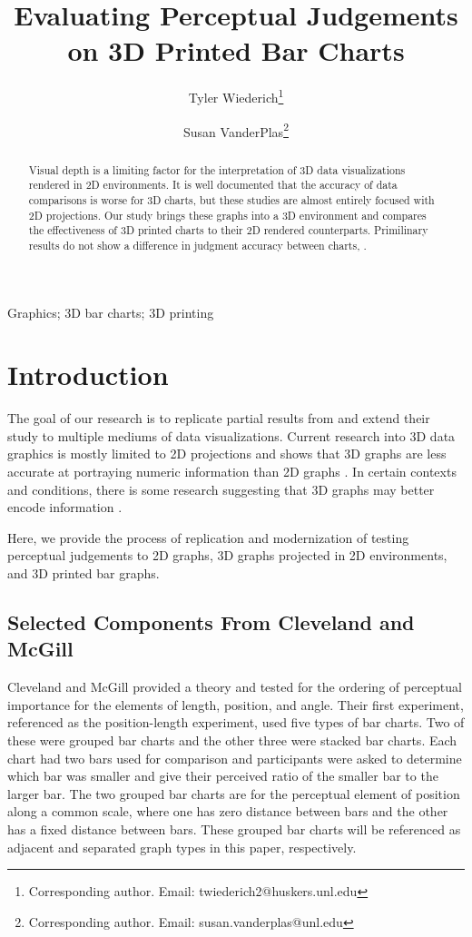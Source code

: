 \documentclass[letterpaper, inpress]{jds} %
\title[Perceptual Judgements on 3D Bar Charts]{Evaluating Perceptual Judgements on 3D Printed Bar Charts}
\author[1]{Tyler Wiederich\thanks{Corresponding author. Email: twiederich2@huskers.unl.edu}}
\author[1]{Susan VanderPlas\footnote{Corresponding author. Email: susan.vanderplas@unl.edu}}
\affil[1]{Department of Statistics, University of Nebraska-Lincoln}
\begin{document}
\maketitle

\begin{abstract}
  Visual depth is a limiting factor for the interpretation of 3D data visualizations rendered in 2D environments. 
  It is well documented that the accuracy of data comparisons is worse for 3D charts, but these studies are almost entirely focused with 2D projections.
  Our study brings these graphs into a 3D environment and compares the effectiveness of 3D printed charts to their 2D rendered counterparts.
  Primilinary results do not show a difference in judgment accuracy between charts, .\@
\end{abstract}

\begin{keywords} %
  Graphics;
  3D bar charts;
  3D printing
\end{keywords}

\section{Introduction}%
\label{sec:intro}

The goal of our research is to replicate partial results from \cite{cleveland_graphical_1984} and extend their study to multiple mediums of data visualizations.
Current research into 3D data graphics is mostly limited to 2D projections and shows that 3D graphs are less accurate at portraying numeric information than 2D graphs \cite{barfield_effects_1989,fisher_data_1997}.
In certain contexts and conditions, there is some research suggesting that 3D graphs may better encode information \cite{brath_3d_2014}. 

Here, we provide the process of replication and modernization of testing perceptual judgements to 2D graphs, 3D graphs projected in 2D environments, and 3D printed bar graphs.


\subsection{Selected Components From Cleveland and McGill}

Cleveland and McGill provided a theory and tested for the ordering of perceptual importance for the elements of length, position, and angle. 
Their first experiment, referenced as the position-length experiment, used five types of bar charts.
Two of these were grouped bar charts and the other three were stacked bar charts.
Each chart had two bars used for comparison and participants were asked to determine which bar was smaller and give their perceived ratio of the smaller bar to the larger bar.
The two grouped bar charts are for the perceptual element of position along a common scale, where one has zero distance between bars and the other has a fixed distance between bars.
These grouped bar charts will be referenced as adjacent and separated graph types in this paper, respectively.
\end{document}

